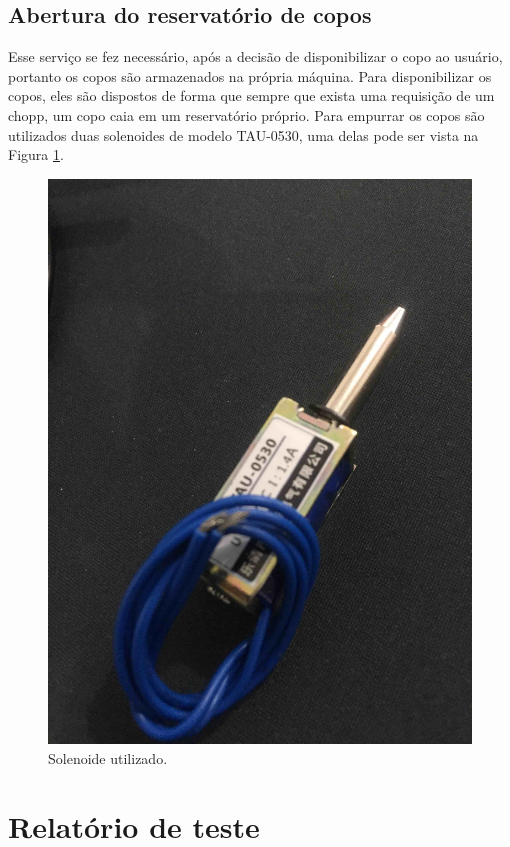 \newpage
\subsection{Abertura do reservatório de copos}

 Esse serviço se fez necessário, após a decisão de disponibilizar o copo ao usuário, 
 portanto os copos são  armazenados na própria máquina. Para disponibilizar os copos, 
 eles são dispostos de forma que sempre que exista uma requisição de um chopp, 
 um copo caia em um reservatório próprio. Para empurrar os copos são utilizados duas 
 solenoides de modelo TAU-0530, uma delas pode ser vista na Figura \ref{solenoide}. 

\begin{figure}[!h]
            \centering
         	\includegraphics[scale= 0.06]{figuras/solenoide.jpg}
            \caption{Solenoide utilizado.}
            \label{solenoide}
\end{figure}

	
\section{Relatório de teste}



